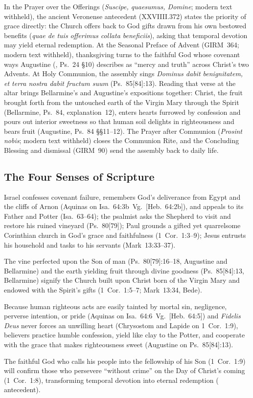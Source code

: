 In the Prayer over the Offerings (\emph{Suscipe, quaesumus, Domine}; modern text withheld), the ancient Veronense antecedent (XXVIIII.372) states the priority of grace directly: the Church offers back to God gifts drawn from his own bestowed benefits (\emph{quae de tuis offerimus collata beneficiis}), asking that temporal devotion may yield eternal redemption. At the Seasonal Preface of Advent (GIRM~364; modern text withheld), thanksgiving turns to the faithful God whose covenant ways Augustine (, Ps.~24 §10) describes as ``mercy and truth'' across Christ's two Advents. At Holy Communion, the assembly sings \emph{Dominus dabit benignitatem, et terra nostra dabit fructum suum} (Ps.~85[84]:13). Reading that verse at the altar brings Bellarmine's and Augustine's expositions together: Christ, the fruit brought forth from the untouched earth of the Virgin Mary through the Spirit (Bellarmine, Ps.~84, explanation~12), enters hearts furrowed by confession and pours out interior sweetness so that human soil delights in righteousness and bears fruit (Augustine, Ps.~84 §§11--12). The Prayer after Communion (\emph{Prosint nobis}; modern text withheld) closes the Communion Rite, and the Concluding Blessing and dismissal (GIRM~90) send the assembly back to daily life.

\subsection{The Four Senses of Scripture}

\begin{fourSenses}
\item[Literal.] Israel confesses covenant failure, remembers God's deliverance from Egypt and the cliffs of Arnon (Aquinas on Isa.~64:3b~Vg.\ [Heb.~64:2b]), and appeals to its Father and Potter (Isa.~63--64); the psalmist asks the Shepherd to visit and restore his ruined vineyard (Ps.~80[79]); Paul grounds a gifted yet quarrelsome Corinthian church in God's grace and faithfulness (1~Cor.~1:3--9); Jesus entrusts his household and tasks to his servants (Mark~13:33--37).
\item[Allegorical.] The vine perfected upon the Son of man (Ps.~80[79]:16--18, Augustine and Bellarmine) and the earth yielding fruit through divine goodness (Ps.~85[84]:13, Bellarmine) signify the Church built upon Christ born of the Virgin Mary and endowed with the Spirit's gifts (1~Cor.~1:5--7; Mark~13:34, Bede).
\item[Moral.] Because human righteous acts are easily tainted by mortal sin, negligence, perverse intention, or pride (Aquinas on Isa.~64:6~Vg.\ [Heb.~64:5]) and \emph{Fidelis Deus} never forces an unwilling heart (Chrysostom and Lapide on 1~Cor.~1:9), believers practice humble confession, yield like clay to the Potter, and cooperate with the grace that makes righteousness sweet (Augustine on Ps.~85[84]:13).
\item[Anagogical.] The faithful God who calls his people into the fellowship of his Son (1~Cor.~1:9) will confirm those who persevere ``without crime'' on the Day of Christ's coming (1~Cor.~1:8), transforming temporal devotion into eternal redemption ( antecedent).
\end{fourSenses}
